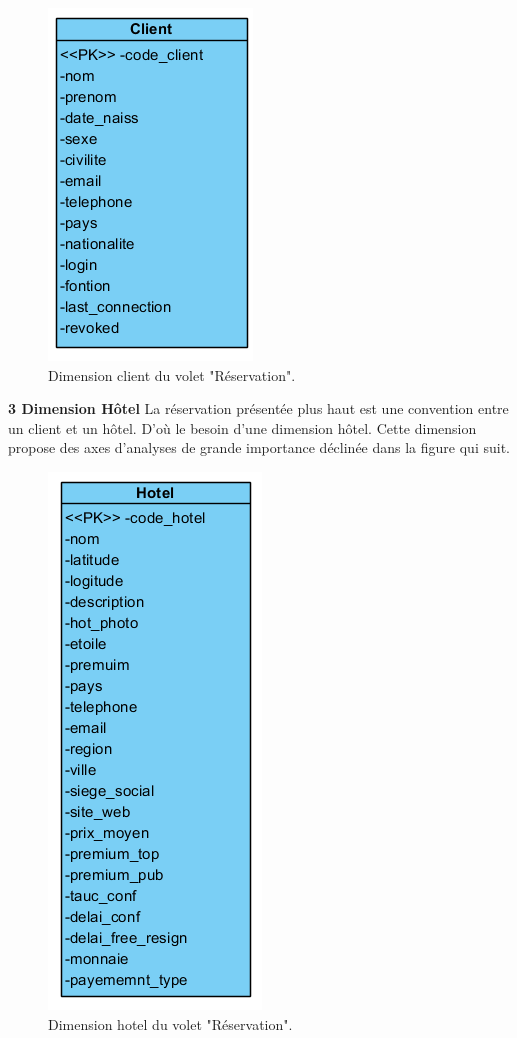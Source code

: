 \begin{figure}[!htbp]
	\begin{center}
		\includegraphics[scale=0.65]{images/dim_client.png}
		\caption{Dimension client du volet "Réservation".}
		\label{use_bi_tools}
	\end{center}
	\end{figure}

\textbf{3 Dimension Hôtel}
La réservation présentée plus haut est une convention entre un client et un hôtel. D’où le besoin d’une dimension hôtel. Cette dimension propose des axes d'analyses de grande importance déclinée dans la figure qui suit.
\cleardoublepage
\begin{figure}[!htbp]
	\begin{center}
		\includegraphics[scale=0.65]{images/dim_hotel.png}
		\caption{Dimension hotel du volet "Réservation".}
		\label{use_bi_tools}
	\end{center}
	\end{figure}


